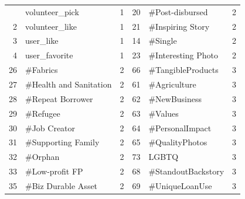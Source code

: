 \begin{longtable}{|r|l|l|r|l|l|}
	\hline \hline
	\endlastfoot
	1           & volunteer\_pick                  & 1                                 & 20          & \#Post-disbursed                  & 2                                 \\
	2           & volunteer\_like                  & 1                                 & 21          & \#Inspiring Story                 & 2                                 \\
	3           & user\_like                       & 1                                 & 14          & \#Single                          & 2                                 \\
	4           & user\_favorite                   & 1                                 & 23          & \#Interesting Photo               & 2                                 \\
	26          & \#Fabrics                        & 2                                 & 66          & \#TangibleProducts                & 3                                 \\
	27          & \#Health and Sanitation          & 2                                 & 61          & \#Agriculture                     & 3                                 \\
	28          & \#Repeat Borrower                & 2                                 & 62          & \#NewBusiness                     & 3                                 \\
	29          & \#Refugee                        & 2                                 & 63          & \#Values                          & 3                                 \\
	30          & \#Job Creator                    & 2                                 & 64          & \#PersonalImpact                  & 3                                 \\
	31          & \#Supporting Family              & 2                                 & 65          & \#QualityPhotos                   & 3                                 \\
	32          & \#Orphan                         & 2                                 & 73          & LGBTQ                             & 3                                 \\
	33          & \#Low-profit FP                  & 2                                 & 68          & \#StandoutBackstory               & 3                                 \\
	35          & \#Biz Durable Asset              & 2                                 & 69          & \#UniqueLoanUse                   & 3                                 \\

\end{longtable}
